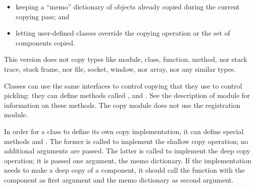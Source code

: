 \begin{itemize}

\item
keeping a ``memo'' dictionary of objects already copied during the current
copying pass; and

\item
letting user-defined classes override the copying operation or the
set of components copied.

\end{itemize}

This version does not copy types like module, class, function, method,
nor stack trace, stack frame, nor file, socket, window, nor array, nor
any similar types.

Classes can use the same interfaces to control copying that they use
to control pickling: they can define methods called
,  and
.  See the description of module 
for information on these methods.
The copy module does not use the  registration
module.

In order for a class to define its own copy implementation, it can
define special methods  and
.  The former is called to
implement the shallow copy operation; no additional arguments are
passed.  The latter is called to implement the deep copy operation; it
is passed one argument, the memo dictionary.  If the
 implementation needs to make a deep copy of a
component, it should call the  function with the
component as first argument and the memo dictionary as second
argument.
